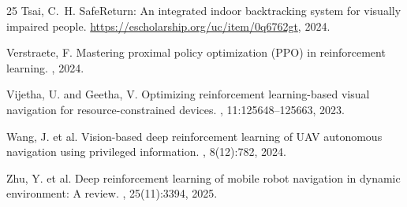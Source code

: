 \documentclass{article}
\begin{document}
\begin{thebibliography}{25}
Tsai, C.~H.
\newblock SafeReturn: An integrated indoor backtracking system for visually impaired
people.
\newblock \url{https://escholarship.org/uc/item/0q6762gt}, 2024.

Verstraete, F.
\newblock Mastering proximal policy optimization (PPO) in reinforcement learning.
, 2024.

Vijetha, U. and Geetha, V.
\newblock Optimizing reinforcement learning-based visual navigation for
resource-constrained devices.
, 11:125648--125663, 2023.

Wang, J. et al.
\newblock Vision-based deep reinforcement learning of UAV autonomous navigation
using privileged information.
, 8(12):782, 2024.

Zhu, Y. et al.
\newblock Deep reinforcement learning of mobile robot navigation in dynamic
environment: A review.
, 25(11):3394, 2025.

\end{thebibliography}
\end{document}
